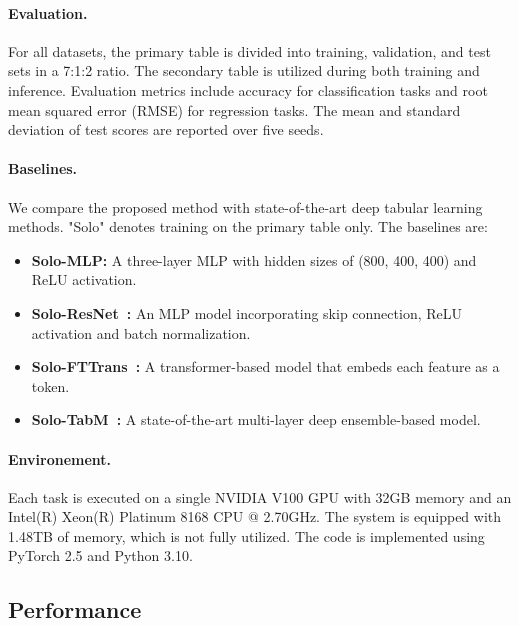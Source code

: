 \paragraph{Evaluation.} For all datasets, the primary table is divided into training, validation, and test sets in a 7:1:2 ratio. The secondary table is utilized during both training and inference. Evaluation metrics include accuracy for classification tasks and root mean squared error (RMSE) for regression tasks. The mean and standard deviation of test scores are reported over five seeds. 



\paragraph{Baselines.} We compare the proposed method with state-of-the-art deep tabular learning methods. "Solo" denotes training on the primary table only. The baselines are:
\begin{itemize}
    \item \textbf{Solo-MLP:} A three-layer MLP with hidden sizes of (800, 400, 400) and ReLU activation.
    \item \textbf{Solo-ResNet~\cite{gorishniy2021revisiting}:} An MLP model incorporating skip connection, ReLU activation and batch normalization.
    \item \textbf{Solo-FTTrans~\cite{gorishniy2021revisiting}:} A transformer-based model that embeds each feature as a token.
    \item \textbf{Solo-TabM~\cite{gorishniy2024tabm}:} A state-of-the-art multi-layer deep ensemble-based model.
\end{itemize}


\paragraph{Environement.} Each task is executed on a single NVIDIA V100 GPU with 32GB memory and an Intel(R) Xeon(R) Platinum 8168 CPU @ 2.70GHz. The system is equipped with 1.48TB of memory, which is not fully utilized. The code is implemented using PyTorch 2.5 and Python 3.10.




\subsection{Performance}

